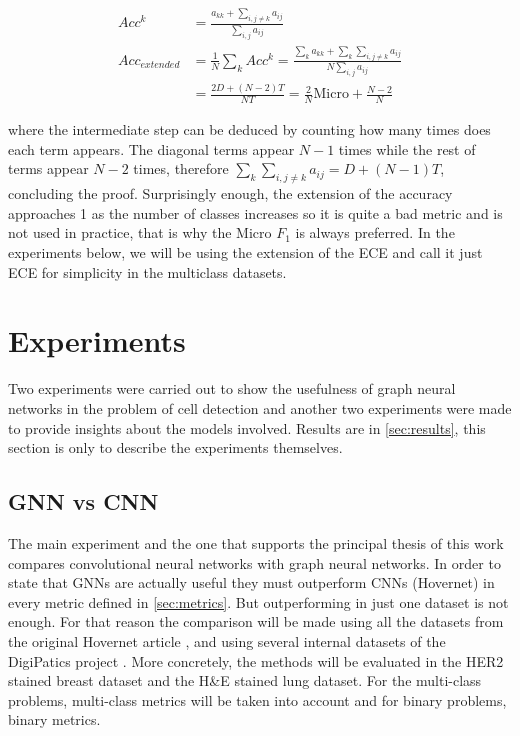 \begin{align}
    Acc^k &= \frac{a_{kk} + \sum_{i,j \neq k} a_{ij}}{\sum_{i,j}a_{ij}} \\
    Acc_{extended} &= \frac{1}{N} \sum_{k} Acc^k = \frac{\sum_{k}a_{kk} + \sum_{k} \sum_{i,j\neq k} a_{ij}}{N \sum_{i,j}a_{ij}} \\
    &= \frac{2D + (N-2) T}{N T} = \frac{2}{N} \text{Micro} + \frac{N-2}{N}
\end{align}

where the intermediate step can be deduced by counting how many times does each term appears. The diagonal terms appear $N-1$ times while the rest of terms appear $N-2$ times, therefore $\sum_{k} \sum_{i,j\neq k} a_{ij} = D + (N-1)T$, concluding the proof. Surprisingly enough, the extension of the accuracy approaches 1 as the number of classes increases so it is quite a bad metric and is not used in practice, that is why the Micro $F_1$ is always preferred. In the experiments below, we will be using the extension of the ECE and call it just ECE for simplicity in the multiclass datasets.

\section{Experiments}\label{sec:exp}

Two experiments were carried out to show the usefulness of graph neural networks in the problem of cell detection and another two experiments were made to provide insights about the models involved. Results are in \autoref{sec:results}, this section is only to describe the experiments themselves. 


\subsection{GNN vs CNN}\label{subsec:gnn-cnn}

The main experiment and the one that supports the principal thesis of this work compares convolutional neural networks with graph neural networks. In order to state that GNNs are actually useful they must outperform CNNs (Hovernet) in every metric defined in \autoref{sec:metrics}. But outperforming in just one dataset is not enough. For that reason the comparison will be made using all the datasets from the original Hovernet article \cite{hovernet, gamper2020pannuke, 8880654}, and using several internal datasets of the DigiPatics project \cite{DigiPatics2022}. More concretely, the methods will be evaluated in the HER2 stained breast dataset and the H\&E stained lung dataset. For the multi-class problems, multi-class metrics will be taken into account and for binary problems, binary metrics.

